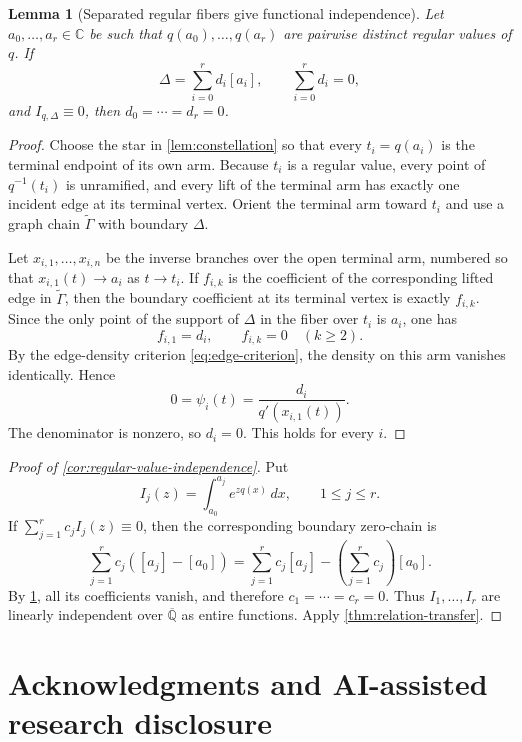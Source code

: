 \documentclass[11pt]{article}
\numberwithin{equation}{section}
\newtheorem{lemma}[lemma]{Lemma}
\theoremstyle{definition}
\theoremstyle{remark}
\newcommand{\C}{\mathbb C}
\newcommand{\Qbar}{\overline{\mathbb Q}}
\begin{document}
\begin{lemma}[Separated regular fibers give functional independence]
\label{lem:regular-fiber-functional-independence}
Let $a_0,\ldots,a_r\in\C$ be such that
$q(a_0),\ldots,q(a_r)$ are pairwise distinct regular values of $q$.  If
\[
  \Delta=\sum_{i=0}^r d_i[a_i],
  \qquad \sum_{i=0}^r d_i=0,
\]
and $I_{q,\Delta}\equiv0$, then $d_0=\cdots=d_r=0$.
\end{lemma}

\begin{proof}
Choose the star in \cref{lem:constellation} so that every
$t_i=q(a_i)$ is the terminal endpoint of its own arm.  Because $t_i$ is a
regular value, every point of $q^{-1}(t_i)$ is unramified, and every lift of
the terminal arm has exactly one incident edge at its terminal vertex.
Orient the terminal arm toward $t_i$ and use a graph chain
$\widetilde\Gamma$ with boundary $\Delta$.

Let $x_{i,1},\ldots,x_{i,n}$ be the inverse branches over the open terminal
arm, numbered so that $x_{i,1}(t)\to a_i$ as $t\to t_i$.  If $f_{i,k}$ is the
coefficient of the corresponding lifted edge in $\widetilde\Gamma$, then the
boundary coefficient at its terminal vertex is exactly $f_{i,k}$.  Since the
only point of the support of $\Delta$ in the fiber over $t_i$ is $a_i$, one
has
\[
  f_{i,1}=d_i,
  \qquad
  f_{i,k}=0\quad(k\ge2).
\]
By the edge-density criterion \eqref{eq:edge-criterion}, the density on this
arm vanishes identically.  Hence
\[
  0=\psi_i(t)=\frac{d_i}{q'(x_{i,1}(t))}.
\]
The denominator is nonzero, so $d_i=0$.  This holds for every $i$.
\end{proof}

\begin{proof}[Proof of \cref{cor:regular-value-independence}]
Put
\[
  I_j(z)=\int_{a_0}^{a_j}e^{zq(x)}\,dx,
  \qquad 1\le j\le r.
\]
If $\sum_{j=1}^r c_jI_j(z)\equiv0$, then the corresponding boundary zero-chain
is
\[
  \sum_{j=1}^r c_j([a_j]-[a_0])
  =\sum_{j=1}^r c_j[a_j]
   -\left(\sum_{j=1}^r c_j\right)[a_0].
\]
By \cref{lem:regular-fiber-functional-independence}, all its coefficients
vanish, and therefore $c_1=\cdots=c_r=0$.  Thus $I_1,\ldots,I_r$ are
linearly independent over $\Qbar$ as entire functions.  Apply
\cref{thm:relation-transfer}.
\end{proof}

\section*{Acknowledgments and AI-assisted research disclosure}
\end{document}
